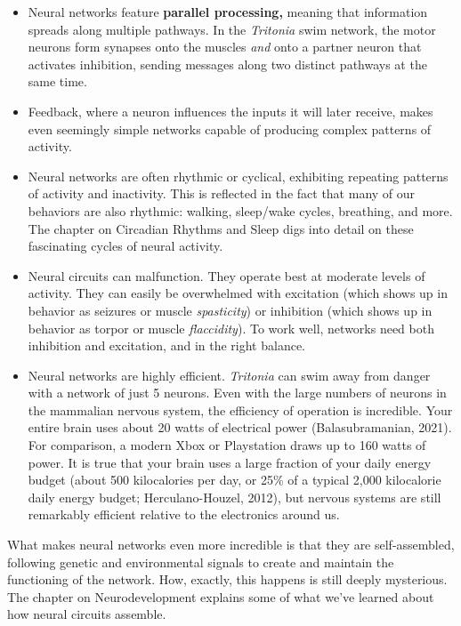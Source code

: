 \documentclass[
]{book}
\providecommand{\tightlist}{%
  \setlength{\itemsep}{0pt}\setlength{\parskip}{0pt}}
\begin{document}
\begin{itemize}
\tightlist
\item
  Neural networks feature \textbf{parallel processing, }meaning that information spreads along multiple pathways. In the \emph{Tritonia} swim network, the motor neurons form synapses onto the muscles \emph{and} onto a partner neuron that activates inhibition, sending messages along two distinct pathways at the same time.
\item
  Feedback, where a neuron influences the inputs it will later receive, makes even seemingly simple networks capable of producing complex patterns of activity.
\item
  Neural networks are often rhythmic or cyclical, exhibiting repeating patterns of activity and inactivity. This is reflected in the fact that many of our behaviors are also rhythmic: walking, sleep/wake cycles, breathing, and more. The chapter on Circadian Rhythms and Sleep digs into detail on these fascinating cycles of neural activity.
\item
  Neural circuits can malfunction. They operate best at moderate levels of activity. They can easily be overwhelmed with excitation (which shows up in behavior as seizures or muscle \emph{spasticity}) or inhibition (which shows up in behavior as torpor or muscle \emph{flaccidity}). To work well, networks need both inhibition and excitation, and in the right balance.
\item
  Neural networks are highly efficient. \emph{Tritonia} can swim away from danger with a network of just 5 neurons. Even with the large numbers of neurons in the mammalian nervous system, the efficiency of operation is incredible. Your entire brain uses about 20 watts of electrical power (Balasubramanian, 2021). For comparison, a modern Xbox or Playstation draws up to 160 watts of power. It is true that your brain uses a large fraction of your daily energy budget (about 500 kilocalories per day, or 25\% of a typical 2,000 kilocalorie daily energy budget; Herculano-Houzel, 2012), but nervous systems are still remarkably efficient relative to the electronics around us.
\end{itemize}

What makes neural networks even more incredible is that they are self-assembled, following genetic and environmental signals to create and maintain the functioning of the network. How, exactly, this happens is still deeply mysterious. The chapter on Neurodevelopment explains some of what we've learned about how neural circuits assemble.
\end{document}
